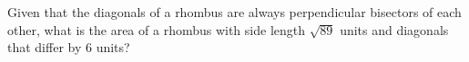 Given that the diagonals of a rhombus are always perpendicular bisectors of each other, what is the area of a rhombus with side length $\sqrt{89}$ units and diagonals that differ by $6$ units?
